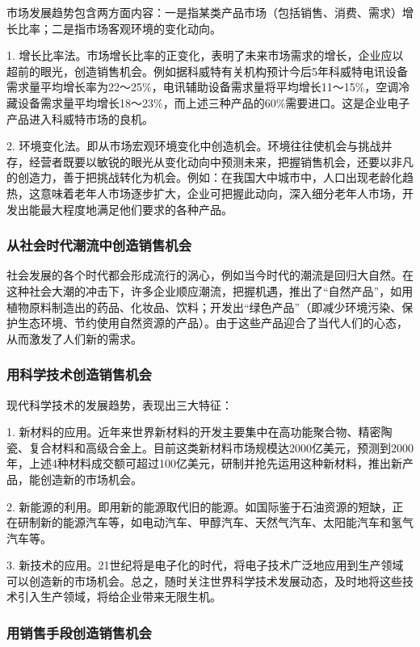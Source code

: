     市场发展趋势包含两方面内容：一是指某类产品市场（包括销售、消费、需求）增长比率；二是指市场客观环境的变化动向。

    1. 增长比率法。市场增长比率的正变化，表明了未来市场需求的增长，企业应以超前的眼光，创造销售机会。例如据科威特有关机构预计今后5年科威特电讯设备需求量平均增长率为22～25\%，电讯辅助设备需求量将平均增长11～15\%，空调冷藏设备需求量平均增长18～23\%，而上述三种产品的60\%需要进口。这是企业电子产品进入科威特市场的良机。

    2. 环境变化法。即从市场宏观环境变化中创造机会。环境往往使机会与挑战并存，经营者既要以敏锐的眼光从变化动向中预测未来，把握销售机会，还要以非凡的创造力，善于把挑战转化为机会。例如：在我国大中城市中，人口出现老龄化趋热，这意味着老年人市场逐步扩大，企业可把握此动向，深入细分老年人市场，开发出能最大程度地满足他们要求的各种产品。

    \subsubsection {从社会时代潮流中创造销售机会}

    社会发展的各个时代都会形成流行的涡心，例如当今时代的潮流是回归大自然。在这种社会大潮的冲击下，许多企业顺应潮流，把握机遇，推出了“自然产品”，如用植物原料制造出的药品、化妆品、饮料；开发出“绿色产品”（即减少环境污染、保护生态环境、节约使用自然资源的产品）。由于这些产品迎合了当代人们的心态，从而激发了人们新的需求。

    \subsubsection {用科学技术创造销售机会}

    现代科学技术的发展趋势，表现出三大特征：

    1. 新材料的应用。近年来世界新材料的开发主要集中在高功能聚合物、精密陶瓷、复合材料和高级合金上。目前这类新材料市场规模达2000亿美元，预测到2000年，上述4种材料成交额可超过100亿美元，研制并抢先运用这种新材料，推出新产品，能创造新的市场机会。

    2. 新能源的利用。即用新的能源取代旧的能源。如国际鉴于石油资源的短缺，正在研制新的能源汽车等，如电动汽车、甲醇汽车、天然气汽车、太阳能汽车和氢气汽车等。

    3. 新技术的应用。21世纪将是电子化的时代，将电子技术广泛地应用到生产领域可以创造新的市场机会。总之，随时关注世界科学技术发展动态，及时地将这些技术引入生产领域，将给企业带来无限生机。

    \subsubsection {用销售手段创造销售机会}

